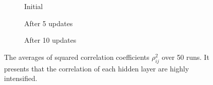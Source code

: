 \begin{figure}
\centering
\newcommand{\myWidth}{.8\textwidth}
\begin{subfigure}{\myWidth}
  \centering
  \caption{Initial}
  \label{fig:sec5_sim2_a}
\end{subfigure}%

\begin{subfigure}{\myWidth}
  \centering
  \caption{After 5 updates}
  \label{fig:sec5_sim2_b}
\end{subfigure}%

\begin{subfigure}{\myWidth}
  \centering
  \caption{After 10 updates}
  \label{fig:sec5_sim2_c}
\end{subfigure}%
\caption{The averages of squared correlation coefficients $\rho_{ij}^2$ over 50 runs. It presents that the correlation of each hidden layer are highly intensified.}
\label{fig:sec5_sim2}
\end{figure}